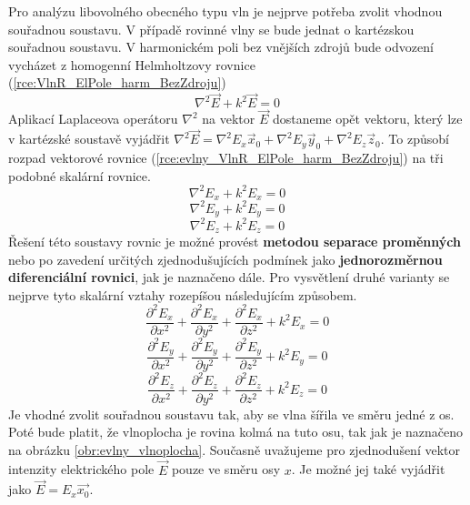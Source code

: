 Pro analýzu libovolného obecného typu vln je nejprve potřeba zvolit vhodnou souřadnou soustavu. V případě rovinné vlny se bude jednat o kartézskou souřadnou soustavu. V harmonickém poli bez vnějších zdrojů bude odvození vycházet z homogenní Helmholtzovy rovnice (\ref{rce:VlnR_ElPole_harm_BezZdroju})
\begin{equation}
	\nabla^{2}\vec E +k^{2}\vec E = 0
	\label{rce:evlny_VlnR_ElPole_harm_BezZdroju}
\end{equation}
Aplikací Laplaceova operátoru $\nabla^{2}$ na vektor $\vec E$ dostaneme opět vektoru, který lze v kartézské soustavě vyjádřit $\nabla^{2}\vec E = \nabla^{2} E_{x}\vec x_{0} + \nabla^{2} E_{y}\vec y_{0} + \nabla^{2} E_{z}\vec z_{0}$. To způsobí rozpad vektorové rovnice (\ref{rce:evlny_VlnR_ElPole_harm_BezZdroju}) na tři podobné skalární rovnice.
\begin{displaymath}
	\nabla^{2} E_{x} +k^{2} E_{x} = 0
\end{displaymath}
\begin{displaymath}
	\nabla^{2} E_{y} +k^{2} E_{y} = 0
\end{displaymath}
\begin{displaymath}
	\nabla^{2} E_{z} +k^{2} E_{z} = 0
\end{displaymath}
Řešení této soustavy rovnic je možné provést {\bf metodou separace proměnných} nebo po zavedení určitých zjednodušujících podmínek jako {\bf jednorozměrnou diferenciální rovnici}, jak je naznačeno dále. Pro vysvětlení druhé varianty se nejprve tyto skalární vztahy rozepíšou následujícím způsobem.
\begin{equation}
	\frac{\partial ^{2} E_{x}}{\partial x^{2}} + \frac{\partial ^{2} E_{x}}{\partial y^{2}} + \frac{\partial ^{2} E_{x}}{\partial z^{2}} + k^{2} E_{x} = 0
	\label{rce:evlny_skalarni1}
\end{equation}
\begin{equation}
	\frac{\partial ^{2} E_{y}}{\partial x^{2}} + \frac{\partial ^{2} E_{y}}{\partial y^{2}} + \frac{\partial ^{2} E_{y}}{\partial z^{2}} + k^{2} E_{y} = 0
	\label{rce:evlny_skalarni2}
\end{equation}
\begin{equation}
	\frac{\partial ^{2} E_{z}}{\partial x^{2}} + \frac{\partial ^{2} E_{z}}{\partial y^{2}} + \frac{\partial ^{2} E_{z}}{\partial z^{2}} + k^{2} E_{z} = 0
	\label{rce:evlny_skalarni3}	
\end{equation}
Je vhodné zvolit souřadnou soustavu tak, aby se vlna šířila ve směru jedné z os. Poté bude platit, že vlnoplocha je rovina kolmá na tuto osu, tak jak je naznačeno na obrázku \ref{obr:evlny_vlnoplocha}. Současně uvažujeme pro zjednodušení vektor intenzity elektrického pole $\vec E$ pouze ve směru osy $x$. Je možné jej také vyjádřit jako $\vec E = E_{x}\vec {x_{0}}$.

